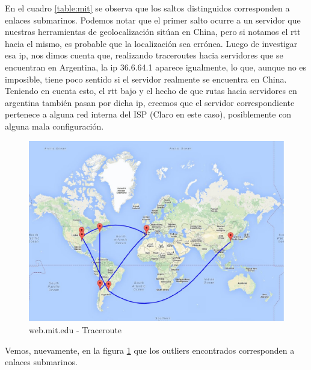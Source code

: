En el cuadro \ref{table:mit} se observa que los saltos distinguidos corresponden a enlaces submarinos. Podemos notar que el primer salto ocurre a un servidor que nuestras herramientas de geolocalización sitúan en China, pero si notamos el rtt hacia el mismo, es probable que la localización sea errónea. Luego de investigar esa ip, nos dimos cuenta que, realizando traceroutes hacia servidores que se encuentran en Argentina, la ip 36.6.64.1 aparece igualmente, lo que, aunque no es imposible, tiene poco sentido si el servidor realmente se encuentra en China. \\
    Teniendo en cuenta esto, el rtt bajo y el hecho de que rutas hacia servidores en  argentina también pasan por dicha ip, creemos que el servidor correspondiente pertenece a alguna red interna del ISP (Claro en este caso), posiblemente con alguna mala configuración.


\begin{figure}[H]
    \begin{center}
        \includegraphics[width=1\textwidth]{data/mapa-mit.jpg}
        \caption{web.mit.edu - Traceroute}
        \label{mapa:mit}
    \end{center}
\end{figure}

Vemos, nuevamente, en la figura \ref{mapa:mit} que los outliers encontrados corresponden a enlaces submarinos.

